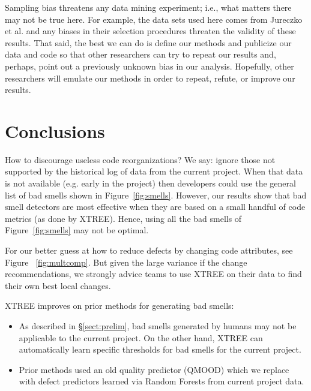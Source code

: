 \documentclass[twocolumn,5p]{elsarticle}
\newcommand{\tion}[1]{\S\ref{sect:#1}}
\newcommand{\fig}[1]{Figure~\ref{fig:#1}}
\theoremstyle{break}
\begin{document}
\begin{itemize}
		Sampling bias threatens any data mining experiment; i.e., what matters
		there may not be true here. For example, the data sets used here comes from Jureczko et al. and any biases in their selection procedures
		threaten the validity of these results. 
		That said,
		the best we can do is define our methods and publicize our data and code so that other researchers can
		try to repeat our results and, perhaps, point out a previously unknown bias
		in our analysis. Hopefully, other researchers will emulate our methods in
		order to repeat, refute, or improve our results. 
		
		
		
		\section{Conclusions}
		How to discourage useless code reorganizations?
		We say: ignore those not supported by the historical log of data from
		the current project.  
		When that data is not available (e.g. early
		in the project) then developers could use the general list of
		bad smells shown in \fig{smells}. However, 
		our results
		show that  bad smell detectors are most
		effective when they are based
		on a small handful of code metrics (as done by XTREE).
		Hence, using all the bad smells of \fig{smells} may not be optimal. 
		
		For our better guess at how to reduce defects by changing code attributes,
		see  Figure ~\ref{fig:multcomp}. But given the large variance if the change recommendations, we strongly advice teams to use
		XTREE on their data to find their own best local changes.
		
		XTREE improves on prior methods for generating bad smells:
		\begin{itemize}
			\item As described in \tion{prelim}, bad smells generated by humans may not be applicable to the current project. On the other hand, XTREE can automatically learn specific thresholds
			for bad smells for the current project.
			\item Prior methods used an old quality predictor (QMOOD) which we replace with defect predictors learned via Random Forests
			from   current project data.
			

\end{itemize}
\end{itemize}
\end{document}

